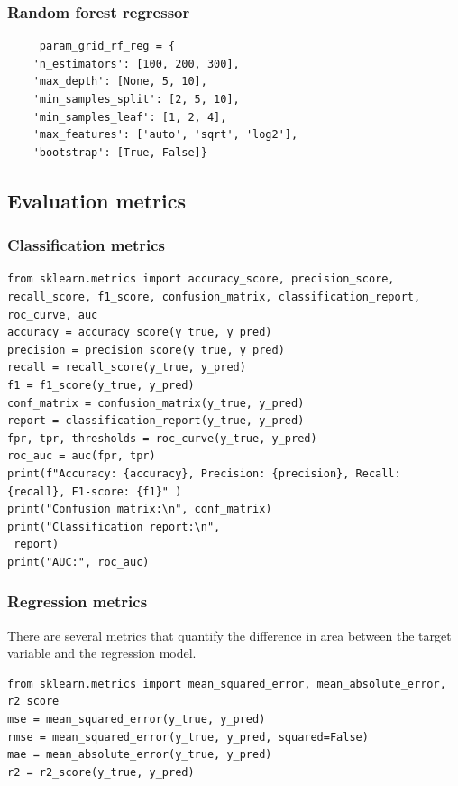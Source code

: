 \documentclass[24pt]{article}
\begin{document}
\subsubsection{Random forest regressor}

\begin{lstlisting}
     param_grid_rf_reg = {
    'n_estimators': [100, 200, 300],
    'max_depth': [None, 5, 10],
    'min_samples_split': [2, 5, 10],
    'min_samples_leaf': [1, 2, 4],
    'max_features': ['auto', 'sqrt', 'log2'],
    'bootstrap': [True, False]}
\end{lstlisting}



\subsection{Evaluation metrics}

\subsubsection{Classification metrics}


\begin{lstlisting}
from sklearn.metrics import accuracy_score, precision_score, recall_score, f1_score, confusion_matrix, classification_report, roc_curve, auc   
accuracy = accuracy_score(y_true, y_pred)
precision = precision_score(y_true, y_pred)
recall = recall_score(y_true, y_pred)
f1 = f1_score(y_true, y_pred)   
conf_matrix = confusion_matrix(y_true, y_pred)   
report = classification_report(y_true, y_pred)
fpr, tpr, thresholds = roc_curve(y_true, y_pred)
roc_auc = auc(fpr, tpr)
print(f"Accuracy: {accuracy}, Precision: {precision}, Recall: {recall}, F1-score: {f1}" )
print("Confusion matrix:\n", conf_matrix)
print("Classification report:\n",   
 report)
print("AUC:", roc_auc)
\end{lstlisting}


\subsubsection{Regression metrics}
There are several metrics that quantify the difference in area between the target variable and the regression model.

\begin{lstlisting}
from sklearn.metrics import mean_squared_error, mean_absolute_error, r2_score
mse = mean_squared_error(y_true, y_pred)
rmse = mean_squared_error(y_true, y_pred, squared=False)
mae = mean_absolute_error(y_true, y_pred)
r2 = r2_score(y_true, y_pred)
\end{lstlisting}
\end{document}
